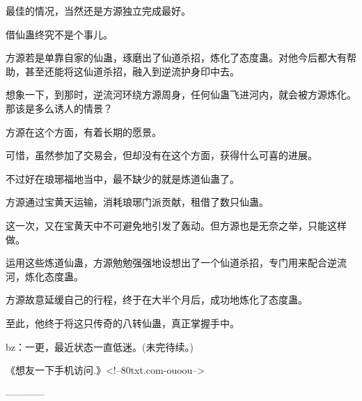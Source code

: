 \begin{this_body}
最佳的情况，当然还是方源独立完成最好。

借仙蛊终究不是个事儿。

方源若是单靠自家的仙蛊，琢磨出了仙道杀招，炼化了态度蛊。对他今后都大有帮助，甚至还能将这仙道杀招，融入到逆流护身印中去。

想象一下，到那时，逆流河环绕方源周身，任何仙蛊飞进河内，就会被方源炼化。那该是多么诱人的情景？

方源在这个方面，有着长期的愿景。

可惜，虽然参加了交易会，但却没有在这个方面，获得什么可喜的进展。

不过好在琅琊福地当中，最不缺少的就是炼道仙蛊了。

方源通过宝黄天运输，消耗琅琊门派贡献，租借了数只仙蛊。

这一次，又在宝黄天中不可避免地引发了轰动。但方源也是无奈之举，只能这样做。

运用这些炼道仙蛊，方源勉勉强强地设想出了一个仙道杀招，专门用来配合逆流河，炼化态度蛊。

方源故意延缓自己的行程，终于在大半个月后，成功地炼化了态度蛊。

至此，他终于将这只传奇的八转仙蛊，真正掌握手中。

bz：一更，最近状态一直低迷。(未完待续。)

《想友一下手机访问.》<!--80txt.com-ouoou-->

------------

\end{this_body}

